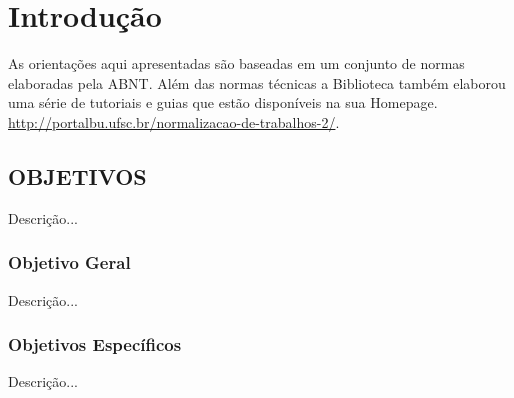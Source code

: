 

\chapter{Introdução}
As orientações aqui apresentadas são baseadas em um conjunto de normas elaboradas pela ABNT. Além das normas técnicas a Biblioteca também elaborou  uma série de tutoriais e guias que estão disponíveis na sua Homepage. \url{http://portalbu.ufsc.br/normalizacao-de-trabalhos-2/}. 


\section{OBJETIVOS}

Descrição...

\subsection{Objetivo Geral}

Descrição...

\subsection{Objetivos Específicos}

Descrição...
